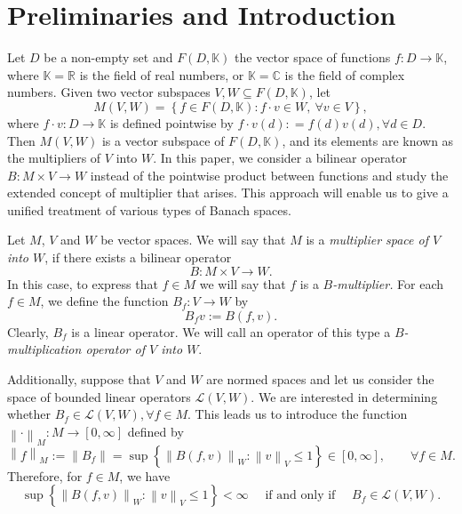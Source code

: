 \documentclass[14pt, a4paper]{article}  %
\providecommand{\llave}[1]{\left\lbrace #1\right\rbrace }
\providecommand{\pare}[1]{\left( #1\right) }
\providecommand{\norm}[1]{\left\lVert#1\right\rVert}
\newcommand{\tien}{\rightarrow}
\newcommand{\R}{\mathbb{R}}
\newcommand{\K}{\mathbb{K}}
\newcommand{\C}{\mathbb{C}}
\begin{document}
	\section{Preliminaries and Introduction}\label{pop1}
	Let $D$ be a non-empty set and $F\pare{D,\K}$ the vector space of functions $f:D\tien \K$, where  $\K=\R$ is the field of real numbers, or $\K=\C$ is the field of complex numbers.  Given two vector subspaces  $V,W\subseteq  F\pare{D,\mathbb{K}}$,  let
	\begin{equation}
	M\pare{V,W}=\llave{f\in F\pare{D,\mathbb{K}}:f\cdot v\in W,\ \forall v\in V},
	\end{equation}
	where $f\cdot v : D \tien \K$ is  defined pointwise by  $f\cdot v\pare{d}: = f\pare{d}v\pare{d},\forall d\in D$.
	Then $M\pare{V,W}$ is a vector subspace of $F\pare{D,\mathbb{K}}$,  and   its  elements are known as the multipliers of $V$ into $W$.   In this paper, we consider a bilinear operator $B:M\times V\tien W$ instead of the pointwise product between functions and study the extended concept of multiplier that arises. This approach will enable us to give a unified treatment of various types of Banach spaces. 
	
 
	
 
	
	 
Let  $M$, $V$ and $W$ be vector spaces. We will say that $M$ is a \emph{multiplier space of $V$ into $W$}, if there exists a bilinear operator \begin{equation}\label{piz6}
B:M\times V\tien W.
\end{equation} In this case, to express that $f\in M$ we will say that $f$ is a \emph{$B$-multiplier.}  For each  $f\in M$, we define the function $B_{f}:V\tien W$ by \begin{equation}\label{piz5}
B_{f}v:=B\pare{f,v}.
\end{equation}
Clearly, $B_f$ is a linear operator. We will call an operator of this type a \emph{$B$-multiplication operator of $V$ into $W$}.


Additionally, suppose that $V$ and $W$ are normed spaces and let us consider the space of bounded linear operators $\mathcal{L}\pare{V,W}$. We are interested in determining whether $B_{f}\in \mathcal{L}\pare{V,W},\forall f\in M$.  This leads us to introduce the function $\norm{\cdot}_{M}:M\to [0,\infty]$
defined by
\begin{equation}\label{piz1}
\norm{f}_{M}:= 
\norm{B_{f}}=\sup\llave{\norm{B\pare{f,v}}_{W}:\norm{v}_{V}\leq 1}\in [0,\infty],\qquad \forall f\in M. 
\end{equation}
Therefore, for $f \in M$, we have   \begin{equation}\label{piz9}
\sup\llave{\norm{B\pare{f,v}}_{W}:\norm{v}_{V}\leq 1}<\infty\quad \text{ if and only if }\quad  B_{f}\in \mathcal{L}\pare{V,W}.  
\end{equation} 
\end{document}
